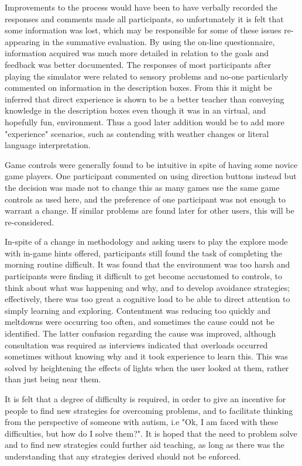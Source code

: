 \documentclass[11pt]{report}
\begin{document}
Improvements to the process would have been to have verbally recorded the responses and comments made all participants, so unfortunately it is felt that some information was lost, which may be responsible for some of these issues re-appearing in the summative evaluation. By using the on-line questionnaire, information acquired was much more detailed in relation to the goals and feedback was better documented. The responses of most participants after playing the simulator were related to sensory problems and no-one particularly commented on information in the description boxes. From this it might be inferred that direct experience is shown to be a better teacher than conveying knowledge in the description boxes even though it was in an virtual, and hopefully fun, environment. Thus a good later addition would be to add more "experience" scenarios, such as contending with weather changes or literal language interpretation.  

Game controls were generally found to be intuitive in spite of having some novice game players. One participant commented on using direction buttons instead but the decision was made not to change this as many games use the same game controls as used here, and the preference of one participant was not enough to warrant a change. If similar problems are found later for other users, this will be re-considered. 

In-spite of a change in methodology and asking users to play the explore mode with in-game hints offered, participants still found the task of completing the morning routine difficult. It was found that the environment was too harsh and participants were finding it difficult to get become accustomed to controls, to think about what was happening and why, and to develop avoidance strategies; effectively, there was too great a cognitive load to be able to direct attention to simply learning and exploring. Contentment was reducing too quickly and meltdowns were occurring too often, and sometimes the cause could not be identified. The latter confusion regarding the cause was improved, although consultation was required as interviews indicated that overloads occurred sometimes without knowing why and it took experience to learn this. This was solved by heightening the effects of lights when the user looked at them, rather than just being near them.

It is felt that a degree of difficulty is required, in order to give an incentive for people to find new strategies for overcoming problems, and to facilitate thinking from the perspective of someone with autism, i.e "Ok, I am faced with these difficulties, but how do I solve them?". It is hoped that the need to problem solve and to find new strategies could further aid teaching, as long as there was the understanding that any strategies derived should not be enforced. 
\end{document}

